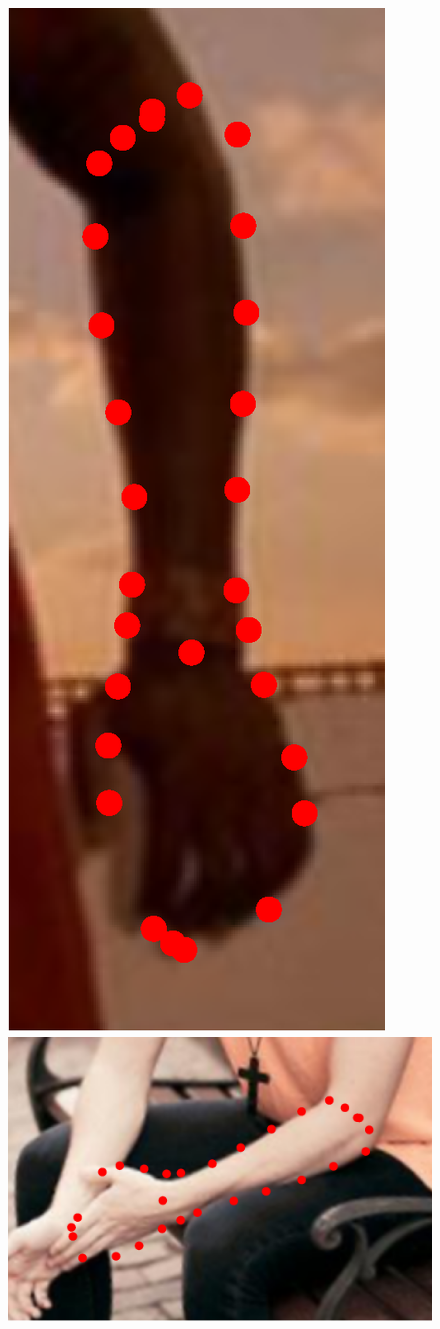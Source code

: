 \begin{figure}[t!]
    \includegraphics[height=\ofh]{resources/Fittings/17.eps}
    \includegraphics[height=\ofh]{resources/Fittings/19.eps}

\end{figure}
